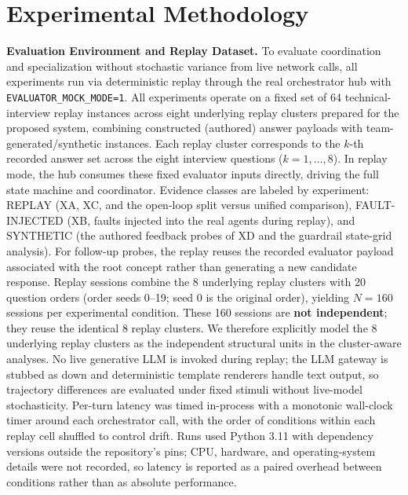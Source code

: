 \section{Experimental Methodology}\label{sec:method}

\noindent\textbf{Evaluation Environment and Replay Dataset.}
To evaluate coordination and specialization without stochastic variance from live network calls, all experiments run via deterministic replay through the real orchestrator hub with \texttt{EVALUATOR\_MOCK\_MODE=1}. All experiments operate on a fixed set of 64 technical-interview replay instances across eight underlying replay clusters prepared for the proposed system, combining constructed (authored) answer payloads with team-generated/synthetic instances. Each replay cluster corresponds to the $k$-th recorded answer set across the eight interview questions ($k = 1, \dots, 8$). In replay mode, the hub consumes these fixed evaluator inputs directly, driving the full state machine and coordinator. Evidence classes are labeled by experiment: REPLAY (XA, XC, and the open-loop split versus unified comparison), FAULT-INJECTED (XB, faults injected into the real agents during replay), and SYNTHETIC (the authored feedback probes of XD and the guardrail state-grid analysis). For follow-up probes, the replay reuses the recorded evaluator payload associated with the root concept rather than generating a new candidate response. Replay sessions combine the 8 underlying replay clusters with 20 question orders (order seeds 0--19; seed 0 is the original order), yielding $N = 160$ sessions per experimental condition. These 160 sessions are \textbf{not independent}; they reuse the identical 8 replay clusters. We therefore explicitly model the 8 underlying replay clusters as the independent structural units in the cluster-aware analyses. No live generative LLM is invoked during replay; the LLM gateway is stubbed as down and deterministic template renderers handle text output, so trajectory differences are evaluated under fixed stimuli without live-model stochasticity. Per-turn latency was timed in-process with a monotonic wall-clock timer around each orchestrator call, with the order of conditions within each replay cell shuffled to control drift. Runs used Python 3.11 with dependency versions outside the repository's pins; CPU, hardware, and operating-system details were not recorded, so latency is reported as a paired overhead between conditions rather than as absolute performance.

